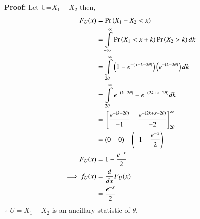 \documentclass[journal,12pt,twocolumn]{IEEEtran}
\begin{document}
\begin{enumerate}
    \textbf{Proof: }Let U=$X_1-X_2$ then,
    \begin{align}
     \nonumber   F_U(x)&=\Pr\left(X_1-X_2<x\right)\\
    \nonumber
    &=\int\limits_{-\infty}^{\infty}\Pr\left(X_1<x+k\right)\Pr\left(X_2>k\right) dk\\
  \nonumber      &= \int\limits_{2\theta}^{\infty}\left(1-e^{-\left(x+k-2\theta\right)}\right)\left(e^{-\left(k-2\theta\right)}\right) dk\\
 \nonumber &=\int\limits_{2\theta}^{\infty}e^{-\left(k-2\theta\right)}-e^{-\left(2k+x-2\theta\right)} dk\\
\nonumber &= {}\left[\frac{e^{-\left(k-2\theta\right)}}{-1}-\frac{e^{-\left(2k+x-2\theta\right)}}{-2}\right]_{2\theta}^{\infty}\\
  \nonumber  &=(0-0)-\left(-1+\frac{e^{-x}}{2}\right)\\
    F_U(x)&= 1-\frac{e^{-x}}{2}\\
    \implies f_U(x)&=\dfrac{d}{dx}F_U(x)\\
    &=\frac{e^{-x}}{2}
    \end{align}
    $\therefore\;U=X_1-X_2$ is an ancillary statistic of $\theta$.
\end{enumerate}
\end{document}
